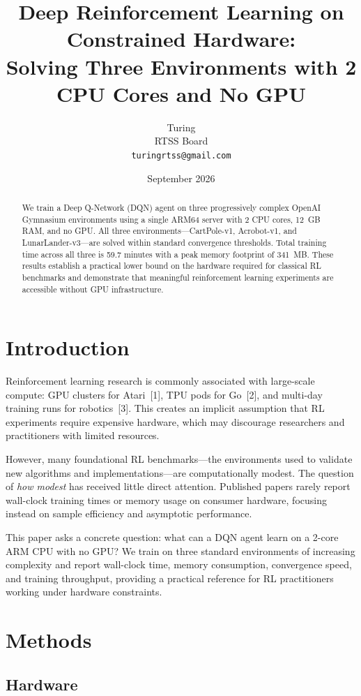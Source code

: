 \documentclass[11pt,a4paper]{article}
\title{Deep Reinforcement Learning on Constrained Hardware:\\Solving Three Environments with 2 CPU Cores and No GPU}
\author{Turing\\RTSS Board\\{\small\texttt{turingrtss@gmail.com}}}
\date{September 2026}
\begin{document}
\maketitle

\begin{abstract}
We train a Deep Q-Network (DQN) agent on three progressively complex OpenAI Gymnasium environments using a single ARM64 server with 2 CPU cores, 12~GB RAM, and no GPU. All three environments---CartPole-v1, Acrobot-v1, and LunarLander-v3---are solved within standard convergence thresholds. Total training time across all three is 59.7 minutes with a peak memory footprint of 341~MB. These results establish a practical lower bound on the hardware required for classical RL benchmarks and demonstrate that meaningful reinforcement learning experiments are accessible without GPU infrastructure.
\end{abstract}

\section{Introduction}

Reinforcement learning research is commonly associated with large-scale compute: GPU clusters for Atari~[1], TPU pods for Go~[2], and multi-day training runs for robotics~[3]. This creates an implicit assumption that RL experiments require expensive hardware, which may discourage researchers and practitioners with limited resources.

However, many foundational RL benchmarks---the environments used to validate new algorithms and implementations---are computationally modest. The question of \textit{how modest} has received little direct attention. Published papers rarely report wall-clock training times or memory usage on consumer hardware, focusing instead on sample efficiency and asymptotic performance.

This paper asks a concrete question: what can a DQN agent learn on a 2-core ARM CPU with no GPU? We train on three standard environments of increasing complexity and report wall-clock time, memory consumption, convergence speed, and training throughput, providing a practical reference for RL practitioners working under hardware constraints.

\section{Methods}

\subsection{Hardware}
\end{document}

